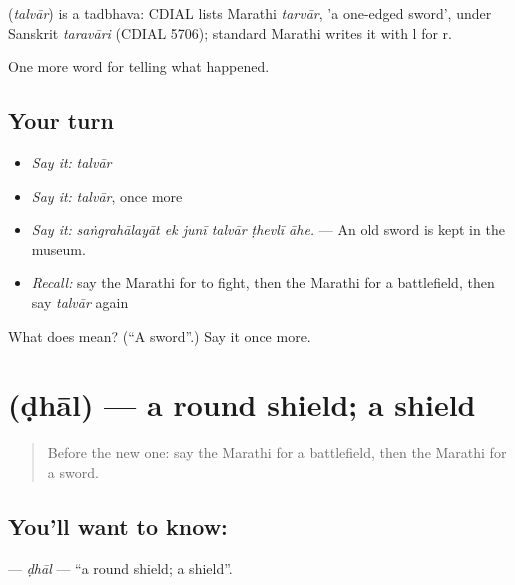 \begin{cousinweb}
\textbf{} (\emph{talvār}) is a tadbhava: CDIAL lists Marathi \emph{tarvār}, 'a one-edged sword', under Sanskrit \emph{taravāri} (CDIAL 5706); standard Marathi writes it with l for r.
\end{cousinweb}

\begin{grammarlens}[title={What you've built}]
One more word for telling what happened.
\end{grammarlens}

\subsection*{Your turn}
\begin{itemize}
\raggedright
  \item \emph{Say it:} \emph{talvār}
  \item \emph{Say it:} \emph{talvār}, once more
  \item \emph{Say it:} \emph{saṅgrahālayāt ek junī talvār ṭhevlī āhe.} — An old sword is kept in the museum.
  \item \emph{Recall:} say the Marathi for to fight, then the Marathi for a battlefield, then say \emph{talvār} again
\end{itemize}

\begin{tcolorbox}[breakable,colback=teal!4,colframe=teal!35!black,title={Before you move on}]
What does  mean? (\textquotedblleft{}A sword\textquotedblright{}.) Say it once more.
\end{tcolorbox}
\section[\texorpdfstring{\mr{ढाल} (ḍhāl)}{ढाल (ḍhāl)}]{ (ḍhāl) — a round shield; a shield}

\label{lesson:MR-C329-dhal}



\begin{quote}
Before the new one: say the Marathi for a battlefield, then the Marathi for a sword.
\end{quote}

\subsection*{You'll want to know: }
\textbf{} — \emph{ḍhāl} — \textquotedblleft{}a round shield; a shield\textquotedblright{}.

